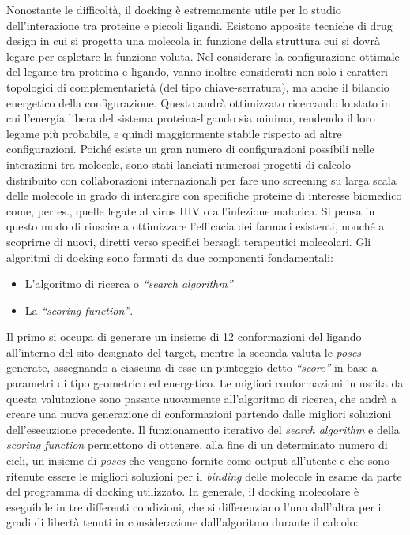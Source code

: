 Nonostante le difficoltà, il docking è estremamente utile per lo studio dell’interazione tra proteine e piccoli ligandi. Esistono apposite tecniche di drug design in cui si progetta una molecola in funzione della struttura cui si dovrà legare per espletare la funzione voluta. Nel considerare la configurazione ottimale del legame tra proteina e ligando, vanno inoltre considerati non solo i caratteri topologici di complementarietà (del tipo chiave-serratura), ma anche il bilancio energetico della configurazione. Questo andrà ottimizzato ricercando lo stato in cui l’energia libera del sistema proteina-ligando sia minima, rendendo il loro legame più probabile, e quindi maggiormente stabile rispetto ad altre configurazioni. Poiché esiste un gran numero di configurazioni possibili nelle interazioni tra molecole, sono stati lanciati numerosi progetti di calcolo distribuito con collaborazioni internazionali per fare uno screening su larga scala delle molecole in grado di interagire con specifiche proteine di interesse biomedico come, per es., quelle legate al virus HIV o all’infezione malarica. Si pensa in questo modo di riuscire a ottimizzare l’efficacia dei farmaci esistenti, nonché a scoprirne di nuovi, diretti verso specifici bersagli terapeutici molecolari\cite{dockingMolecolare}.\newline
Gli algoritmi di docking sono formati da due componenti fondamentali:

\begin{itemize}
    \item L’algoritmo di ricerca o \textit{“search algorithm”}
    \item La \textit{“scoring function”}.
\end{itemize} 

Il primo si occupa di generare un insieme di 12 conformazioni del ligando all’interno del sito designato del target, mentre la seconda valuta le \textit{poses} generate, assegnando a ciascuna di esse un punteggio detto \textit{“score”} in base a parametri di tipo geometrico ed energetico. Le migliori conformazioni in uscita da questa valutazione sono passate nuovamente all’algoritmo di ricerca, che andrà a creare una nuova generazione di conformazioni partendo dalle migliori soluzioni dell'esecuzione precedente. Il funzionamento iterativo del \textit{search algorithm} e della \textit{scoring function} permettono di ottenere, alla fine di un determinato numero di cicli, un insieme di \textit{poses} che vengono fornite come output all’utente e che sono ritenute essere le migliori soluzioni per il \textit{binding} delle molecole in esame da parte del programma di docking utilizzato.\newline
In generale, il docking molecolare è eseguibile in tre differenti condizioni, che si differenziano l’una dall’altra per i gradi di libertà tenuti in considerazione dall’algoritmo durante il calcolo: 

